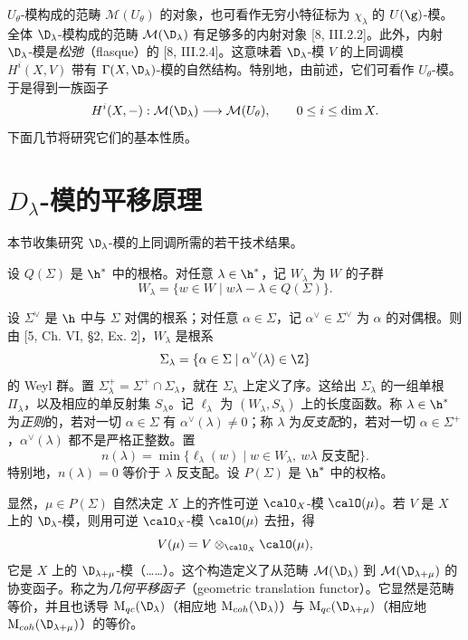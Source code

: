 $U_\theta$-模构成的范畴 $\mathcal{M}(U_\theta)$ 的对象，也可看作无穷小特征标为 $\chi_\lambda$ 的 $U(\g)$-模。全体 $\D_\lambda$-模构成的范畴 $\mathcal{M}(\D_\lambda)$ 有足够多的内射对象 [8, III.2.2]。此外，内射 $\D_\lambda$-模是\emph{松弛}（flasque）的 [8, III.2.4]。这意味着 $\D_\lambda$-模 $V$ 的上同调模 $H^i(X,V)$ 带有 $\Gamma(X,\D_\lambda)$-模的自然结构。特别地，由前述，它们可看作 $U_\theta$-模。于是得到一族函子
$$H^i(X,-):\mathcal{M}(\D_\lambda)\longrightarrow\mathcal{M}(U_\theta),\qquad 0\le i\le\dim X.$$
下面几节将研究它们的基本性质。

\section{$D_\lambda$-模的平移原理}
\label{sec:02.2.2}

本节收集研究 $\D_\lambda$-模的上同调所需的若干技术结果。

设 $Q(\Sigma)$ 是 $\h^*$ 中的根格。对任意 $\lambda\in\h^*$，记 $W_\lambda$ 为 $W$ 的子群
$$W_\lambda=\{w\in W\mid w\lambda-\lambda\in Q(\Sigma)\}.$$

设 $\Sigma^\vee$ 是 $\h$ 中与 $\Sigma$ 对偶的根系；对任意 $\alpha\in\Sigma$，记 $\alpha^\vee\in\Sigma^\vee$ 为 $\alpha$ 的对偶根。则由 [5, Ch. VI, §2, Ex. 2]，$W_\lambda$ 是根系
$$\Sigma_\lambda=\{\alpha\in\Sigma\mid \alpha^\vee(\lambda)\in\Z\}$$
的 Weyl 群。置 $\Sigma_\lambda^+=\Sigma^+\cap\Sigma_\lambda$，就在 $\Sigma_\lambda$ 上定义了序。这给出 $\Sigma_\lambda$ 的一组单根 $\Pi_\lambda$，以及相应的单反射集 $S_\lambda$。记 $\ell_\lambda$ 为 $(W_\lambda,S_\lambda)$ 上的长度函数。称 $\lambda\in\h^*$ 为\emph{正则}的，若对一切 $\alpha\in\Sigma$ 有 $\alpha^\vee(\lambda)\neq0$；称 $\lambda$ 为\emph{反支配}的，若对一切 $\alpha\in\Sigma^+$，$\alpha^\vee(\lambda)$ 都不是严格正整数。置
$$n(\lambda)=\min\{\ell_\lambda(w)\mid w\in W_\lambda,\ w\lambda \text{ 反支配}\}.$$
特别地，$n(\lambda)=0$ 等价于 $\lambda$ 反支配。设 $P(\Sigma)$ 是 $\h^*$ 中的权格。

显然，$\mu\in P(\Sigma)$ 自然决定 $X$ 上的齐性可逆 $\calO_X$-模 $\calO(\mu)$。若 $V$ 是 $X$ 上的 $\D_\lambda$-模，则用可逆 $\calO_X$-模 $\calO(\mu)$ 去扭，得
$$V(\mu)=V\otimes_{\calO_X}\calO(\mu),$$
它是 $X$ 上的 $\D_{\lambda+\mu}$-模（……）。这个构造定义了从范畴 $\mathcal{M}(\D_\lambda)$ 到 $\mathcal{M}(\D_{\lambda+\mu})$ 的协变函子。称之为\emph{几何平移函子}（geometric translation functor）。它显然是范畴等价，并且也诱导 $\mathrm{M}_{qc}(\D_\lambda)$（相应地 $\mathrm{M}_{coh}(\D_\lambda)$）与 $\mathrm{M}_{qc}(\D_{\lambda+\mu})$（相应地 $\mathrm{M}_{coh}(\D_{\lambda+\mu})$）的等价。

